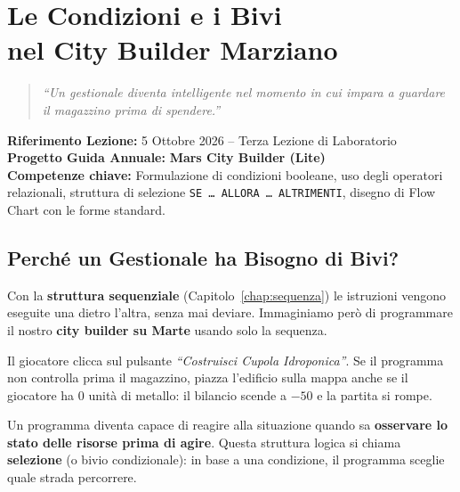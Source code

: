 \chapter[Le Condizioni e i Bivi nel City Builder Marziano]{Le Condizioni e i Bivi\\ nel City Builder Marziano}
\label{chap:condizioni}

\begin{quote}
\itshape
\small
``Un gestionale diventa intelligente nel momento in cui impara a guardare il magazzino prima di spendere.''
\end{quote}
\vspace{1em}

\noindent\textbf{Riferimento Lezione:} 5 Ottobre 2026 -- Terza Lezione di Laboratorio\\
\textbf{Progetto Guida Annuale:} \textbf{\color{PiazzaPrimary}Mars City Builder (Lite)}\\
\textbf{Competenze chiave:} Formulazione di condizioni booleane, uso degli operatori relazionali, struttura di selezione \texttt{SE \dots\ ALLORA \dots\ ALTRIMENTI}, disegno di Flow Chart con le forme standard.

\vspace{1.5em}

\section{Perché un Gestionale ha Bisogno di Bivi?}

Con la \textbf{struttura sequenziale} (Capitolo~\ref{chap:sequenza}) le istruzioni vengono eseguite una dietro l'altra, senza mai deviare. Immaginiamo però di programmare il nostro \textbf{city builder su Marte} usando solo la sequenza.

Il giocatore clicca sul pulsante \emph{``Costruisci Cupola Idroponica''}. Se il programma non controlla prima il magazzino, piazza l'edificio sulla mappa anche se il giocatore ha 0 unità di metallo: il bilancio scende a $-50$ e la partita si rompe.

\begin{concetto}[La Selezione]
Un programma diventa capace di reagire alla situazione quando sa \textbf{osservare lo stato delle risorse prima di agire}. Questa struttura logica si chiama \textbf{selezione} (o bivio condizionale): in base a una condizione, il programma sceglie quale strada percorrere.
\end{concetto}

